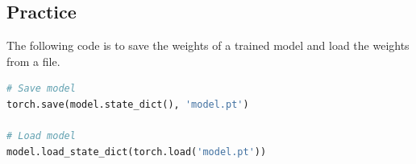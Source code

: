 \subsection{Practice}

The following code is to save the weights of a trained model and load the weights from a file. 

\begin{lstlisting}[language=Python]
# Save model
torch.save(model.state_dict(), 'model.pt')

# Load model
model.load_state_dict(torch.load('model.pt'))
\end{lstlisting}